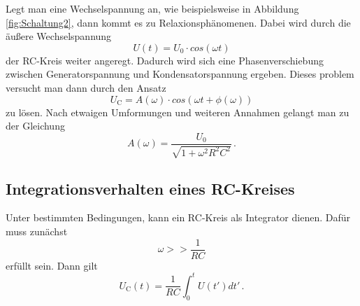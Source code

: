 Legt man eine Wechselspannung an, wie beispielsweise in Abbildung \ref{fig:Schaltung2}, dann kommt es zu
Relaxionsphänomenen.
Dabei wird durch die äußere Wechselspannung
\begin{equation}
    U(t) = U_0 \cdot cos(\omega t)
\end{equation}
der RC-Kreis weiter angeregt.
Dadurch wird sich eine Phasenverschiebung zwischen Generatorspannung und Kondensatorspannung ergeben.
Dieses problem versucht man dann durch den Ansatz
\begin{equation*}
    U_\text{C} = A(\omega) \cdot cos(\omega t + \phi(\omega))
\end{equation*}
zu lösen.
Nach etwaigen Umformungen und weiteren Annahmen gelangt man zu der Gleichung
\begin{equation} \label{eq:amp}
    A(\omega) = \frac {U_0}{\sqrt{1 + \omega^2 R^2 C^2}} \, .
\end{equation}

\subsection{Integrationsverhalten eines RC-Kreises}
Unter bestimmten Bedingungen, kann ein RC-Kreis als Integrator dienen.
Dafür muss zunächst
\begin{equation*}
    \omega >> \frac {1}{R C}
\end{equation*}
erfüllt sein. Dann gilt
\begin{equation}
    U_\text{C} (t) = \frac{1}{R C} \int_0^t U(t')dt' \, .
\end{equation}